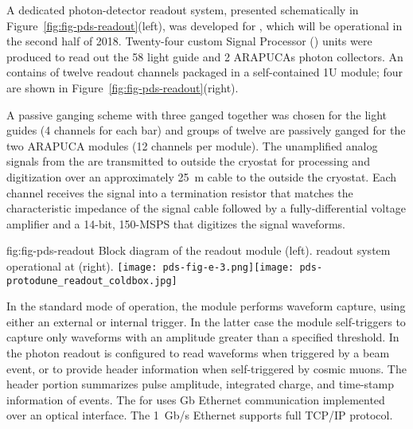 A dedicated photon-detector readout system, presented schematically  in Figure~\ref{fig:fig-pds-readout}(left), was developed for , which will be operational in the second half of \num{2018}.  Twenty-four custom  Signal Processor () units were produced to read out the 58 light guide and 2 ARAPUCAs photon collectors.  
An  contains of twelve readout channels packaged in  a self-contained 1U module; four  are shown in Figure~\ref{fig:fig-pds-readout}(right).

A passive ganging scheme with three  ganged together was chosen for the light guides (4  channels for each bar) and groups of twelve  are passively ganged for the two ARAPUCA modules (12  channels per module).  The unamplified analog signals from the  are transmitted to outside the cryostat for processing and digitization over an approximately \SI{25}{m} cable to the  outside the cryostat. 
 Each channel receives the  signal into a termination resistor that matches the characteristic impedance of the signal cable followed by a fully-differential voltage amplifier and a \num{14}-bit, \num{150}-MSPS  that digitizes the  signal waveforms. 
  

 \begin{dunefigure}
 {fig:fig-pds-readout}
 {Block diagram of the    readout module (left).   readout system operational at  (right). }
\texttt{[image: pds-fig-e-3.png]}\texttt{[image: pds-protodune\_readout\_coldbox.jpg]}
\end{dunefigure}

In the standard mode of operation, the module performs waveform capture, using either an external or internal trigger. In the latter case the 
module self-triggers to capture only waveforms with an amplitude greater than a specified threshold. In  the photon readout 
is configured to read waveforms when triggered by a beam event, or to provide header information when self-triggered by cosmic muons.
The header portion summarizes pulse amplitude, integrated charge, and time-stamp information of events. The  for  uses \si{Gb} Ethernet 
communication implemented over an optical interface. The \SI{1}{Gb/s} Ethernet supports full TCP/IP protocol.  

